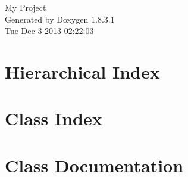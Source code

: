 \documentclass{book}
\begin{document}
\hypersetup{pageanchor=false,citecolor=blue}
\begin{titlepage}
\vspace*{7cm}
\begin{center}
{\Large My Project }\\
\vspace*{1cm}
{\large Generated by Doxygen 1.8.3.1}\\
\vspace*{0.5cm}
{\small Tue Dec 3 2013 02:22:03}\\
\end{center}
\end{titlepage}
\clearemptydoublepage
{}
\tableofcontents
\clearemptydoublepage
{}
\hypersetup{pageanchor=true,citecolor=blue}
\chapter{Hierarchical Index}

\chapter{Class Index}

\chapter{Class Documentation}

































\printindex
\end{document}
